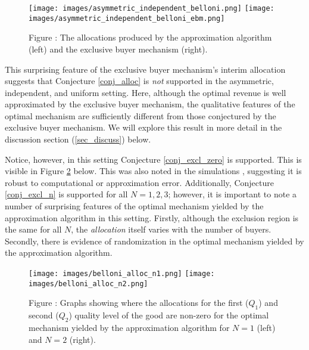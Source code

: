 \begin{figure}[H]
    \begin{center}
    \texttt{[image: images/asymmetric\_independent\_belloni.png]}
    \texttt{[image: images/asymmetric\_independent\_belloni\_ebm.png]}
    \end{center}
    
    \vspace{1mm}
    \raggedright{\small {\sc Figure \thefig\label{fig:belloni_alloc}:} The allocations produced by the approximation algorithm (left) and the exclusive buyer mechanism (right).} 
\end{figure}

\noindent This surprising feature of the exclusive buyer mechanism's interim allocation suggests that Conjecture \ref{conj_alloc} is \textit{not} supported in the asymmetric, independent, and uniform setting. Here, although the optimal revenue is well approximated by the exclusive buyer mechanism, the qualitative features of the optimal mechanism are sufficiently different from those conjectured by the exclusive buyer mechanism. We will explore this result in more detail in the discussion section (\ref{sec_discuss}) below.

Notice, however, in this setting Conjecture \ref{conj_excl_zero} is supported. This is visible in Figure \ref{fig:belloni_alloc_alln} below. This was also noted in the simulations \autocite{belloni2010multidimensional}, suggesting it is robust to computational or approximation error. Additionally, Conjecture \ref{conj_excl_n} is supported for all $N=1,2,3$; however, it is important to note a number of surprising features of the optimal mechanism yielded by the approximation algorithm in this setting. Firstly, although the exclusion region is the same for all $N$, the \textit{allocation} itself varies with the number of buyers. Secondly, there is evidence of randomization in the optimal mechanism yielded by the approximation algorithm. 

\begin{figure}[H]
    \begin{center}
    \texttt{[image: images/belloni\_alloc\_n1.png]}
    \texttt{[image: images/belloni\_alloc\_n2.png]}
    \end{center}
    
    \vspace{1mm}
    \raggedright{\small {\sc Figure \thefig\label{fig:belloni_alloc_alln}:} Graphs showing where the allocations for the first ($Q_1$) and second ($Q_2$) quality level of the good are non-zero for the optimal mechanism yielded by the approximation algorithm for $N=1$ (left) and $N=2$ (right).} 
\end{figure}

